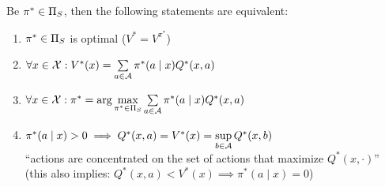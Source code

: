 \begin{prop}\label{sup is attained}Be \(\pi^*\in\Pi_S\), then the following statements are equivalent:
\begin{enumerate}[label={(\roman*)},font=\normalfont]
\item \label{ii:1}\(\pi^* \in\Pi_S\) is optimal (\(V^*=V^{\pi^*}\))
\item \label{ii:2} \(\forall x\in\mathcal{X}: V^*(x)=\sum\limits_{a\in\mathcal{A}}\pi^*(a\mid x)Q^*(x,a)\)
\item\label{ii:3} \(\forall x\in\mathcal{X}: \pi^*=\arg\max\limits_{\pi^*\in\Pi_S}\sum\limits_{a\in\mathcal{A}}\pi^*(a\mid x)Q^*(x,a) \)
\item\label{ii:4} \(\pi^*(a\mid x)>0 \implies Q^*(x,a)=V^*(x) =\sup\limits_{b\in\mathcal{A}}Q^*(x,b)\) \\
	``actions are concentrated on the set of actions that maximize \(Q^*(x,\cdot)\)''\\
	(this also implies: \(Q^*(x,a)<V^*(x) \implies \pi^*(a\mid x)=0\))
\end{enumerate}
\end{prop}

